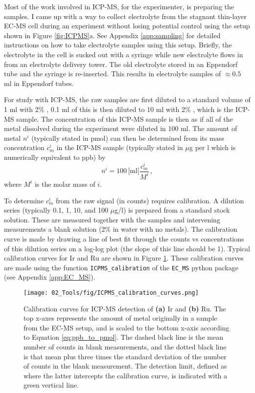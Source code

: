 Most of the work involved in ICP-MS, for the experimenter, is preparing the samples. I came up with a way to collect electrolyte from the stagnant thin-layer EC-MS cell during an experiment without losing potential control using the setup shown in Figure \ref{fig:ICPMS}a. See Appendix \ref{app:sampling} for detailed instructions on how to take electrolyte samples using this setup. Briefly, the electrolyte in the cell is sucked out with a syringe while new electrolyte flows in from an electrolyte delivery tower. The old electrolyte stored in an Eppendorf tube and the syringe is re-inserted. This results in electrolyte samples of $\approx 0.5$ ml in Eppendorf tubes. 

For study with ICP-MS, the raw samples are first diluted to a standard volume of 1 ml with 2\% , 0.1 ml of this is then diluted to 10 ml with 2\% , which is the ICP-MS sample. The concentration of this ICP-MS sample is then as if all of the metal dissolved during the experiment were diluted in 100 ml. The amount of metal $n^i$ (typically stated in pmol) can then be determined from its mass concentration $c_m^i$ in the ICP-MS sample (typically stated in $\mu$g per l which is numerically equivalent to ppb) by
\begin{equation}
n^i = 100\,\text{[ml]}\frac{c_m^i}{M^i}\,,\label{eq:ppb_to_pmol}
\end{equation}
where $M^i$ is the molar mass of $i$.

To determine $c_m^i$ from the raw signal (in counts) requires calibration. A dilution series (typically 0.1, 1, 10, and 100 $\mu$g/l) is prepared from a standard stock solution. These are measured together with the samples and intervening measurements a blank solution (2\%  in water with no metals). The calibration curve is made by drawing a line of best fit through the counts vs concentrations of this dilution series on a log-log plot (the slope of this line should be 1). Typical calibration curves for Ir and Ru are shown in Figure \ref{fig:ICPMS_cal}. These calibration curves are made using the function \texttt{ICPMS\_calibration} of the \texttt{EC\_MS} python package (see Appendix \ref{app:EC_MS}).

\begin{figure}[h!]
	\centering
	\texttt{[image: 02\_Tools/fig/ICPMS\_calibration\_curves.png]}
	\caption{Calibration curves for ICP-MS detection of \textbf{(a)} Ir and \textbf{(b)} Ru. The top x-axes represents the amount of metal originally in a sample from the EC-MS setup, and is scaled to the bottom x-axis according to Equation \ref{eq:ppb_to_pmol}. The dashed black line is the mean number of counts in blank measurements, and the dotted black line is that mean plus three times the standard deviation of the number of counts in the blank measurement. The detection limit, defined as where the latter intercepts the calibration curve, is indicated with a green vertical line.}
	\label{fig:ICPMS_cal}
\end{figure}

